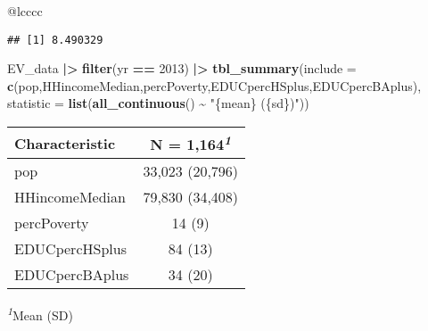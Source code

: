 \documentclass[
]{article}
\newenvironment{Shaded}{\begin{snugshade}}{\end{snugshade}}
\newcommand{\AttributeTok}[1]{\textcolor[rgb]{0.13,0.29,0.53}{#1}}
\newcommand{\DecValTok}[1]{\textcolor[rgb]{0.00,0.00,0.81}{#1}}
\newcommand{\FunctionTok}[1]{\textcolor[rgb]{0.13,0.29,0.53}{\textbf{#1}}}
\newcommand{\NormalTok}[1]{#1}
\newcommand{\SpecialCharTok}[1]{\textcolor[rgb]{0.81,0.36,0.00}{\textbf{#1}}}
\newcommand{\StringTok}[1]{\textcolor[rgb]{0.31,0.60,0.02}{#1}}
\begin{document}
\begin{table}[t]
\begin{tabular*}{\linewidth}{@{\extracolsep{\fill}}lcccc}
\begin{Shaded}
\end{Shaded}

\begin{verbatim}
## [1] 8.490329
\end{verbatim}

\begin{Shaded}
\begin{Highlighting}[]
\NormalTok{EV\_data }\SpecialCharTok{|\textgreater{}} \FunctionTok{filter}\NormalTok{(yr }\SpecialCharTok{==} \DecValTok{2013}\NormalTok{) }\SpecialCharTok{|\textgreater{}} \FunctionTok{tbl\_summary}\NormalTok{(}\AttributeTok{include =} \FunctionTok{c}\NormalTok{(pop,HHincomeMedian,percPoverty,EDUCpercHSplus,EDUCpercBAplus),}
                       \AttributeTok{statistic =} \FunctionTok{list}\NormalTok{(}\FunctionTok{all\_continuous}\NormalTok{() }\SpecialCharTok{\textasciitilde{}} \StringTok{"\{mean\} (\{sd\})"}\NormalTok{))}
\end{Highlighting}
\end{Shaded}

\begin{table}[t]
\fontsize{12.0pt}{14.4pt}\selectfont
\begin{tabular*}{\linewidth}{@{\extracolsep{\fill}}lc}
\toprule
\textbf{Characteristic} & \textbf{N = 1,164}\textsuperscript{\textit{1}} \\ 
\midrule\addlinespace[2.5pt]
pop & 33,023 (20,796) \\ 
HHincomeMedian & 79,830 (34,408) \\ 
percPoverty & 14 (9) \\ 
EDUCpercHSplus & 84 (13) \\ 
EDUCpercBAplus & 34 (20) \\ 
\bottomrule
\end{tabular*}
\begin{minipage}{\linewidth}
\textsuperscript{\textit{1}}Mean (SD)\\
\end{minipage}
\end{table}


\end{tabular*}
\end{table}
\end{document}
